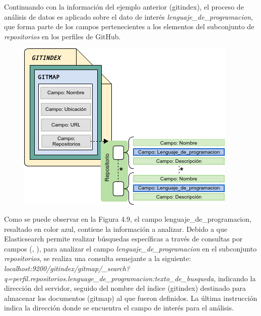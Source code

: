 Continuando con la información del ejemplo anterior (gitindex), el proceso de análisis de datos es aplicado sobre el dato de interés \textit{lenguaje\_de\_programacion}, que forma parte de los campos pertenecientes a los elementos del subconjunto de \textit{repositorios} en los perfiles de GitHub. 

\begin{figure}[H]
	\centering
	\includegraphics[height=0.25\textheight]{fig01/mapping_g}
	\label{fig:RHP02}
\end{figure}

Como se puede observar en la Figura 4.9, el campo lenguaje\_de\_programacion, resaltado en color azul, contiene la información a analizar. Debido a que
Elasticsearch permite realizar búsquedas específicas a través de consultas por campos (\citeauthor{Gormley}, \citeyear{Gormley}), para analizar el campo \textit{lenguaje\_de\_programacion} en el subconjunto \textit{repositorios}, se realiza una consulta semejante a la siguiente:
{\small \textit{ localhost:9200/gitindex/gitmap/\_search? q=perfil.repositorios.lenguage\_de\_programacion:texto\_de\_busqueda}}, indicando la dirección del servidor, seguido del nombre del índice (gitindex) destinado para almacenar los documentos (gitmap) al que fueron definidos. La última instrucción indica la dirección donde se encuentra el campo de interés para el análisis. 


